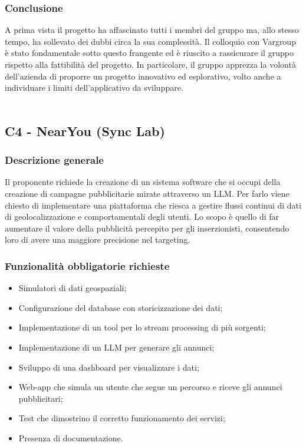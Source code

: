\documentclass[10pt]{article}
\begin{document}
\subsubsection{Conclusione}
A prima vista il progetto ha affascinato tutti i membri del gruppo ma, allo stesso tempo, ha sollevato dei dubbi circa la sua complessità. Il colloquio con Vargroup è stato fondamentale sotto questo frangente ed è riuscito a rassicurare il gruppo rispetto alla fattibilità del progetto. In particolare, il gruppo apprezza la volontà dell’azienda di proporre un progetto innovativo ed esplorativo, volto anche a individuare i limiti dell’applicativo da sviluppare.
\\\\
\subsection{C4 - NearYou (Sync Lab)}
\subsubsection{Descrizione generale}
Il proponente richiede la creazione di un sistema software che si occupi della creazione di campagne pubblicitarie mirate attraverso un LLM. Per farlo viene chiesto di implementare una piattaforma che riesca a gestire flussi continui di dati di geolocalizzazione e comportamentali degli utenti. Lo scopo è quello di far aumentare il valore della pubblicità percepito per gli inserzionisti, consentendo loro di avere una maggiore precisione nel targeting.
\subsubsection{Funzionalità obbligatorie richieste}
\begin{itemize}
    \item Simulatori di dati geospaziali;
    \item Configurazione del database con storicizzazione dei dati;
    \item Implementazione di un tool per lo stream processing di più sorgenti;
    \item Implementazione di un LLM per generare gli annunci;
    \item Sviluppo di una dashboard per visualizzare i dati;
    \item Web-app che simula un utente che segue un percorso e riceve gli annunci pubblicitari;
    \item Test che dimostrino il corretto funzionamento dei servizi;
    \item Presenza di documentazione.
\end{itemize}
\end{document}
